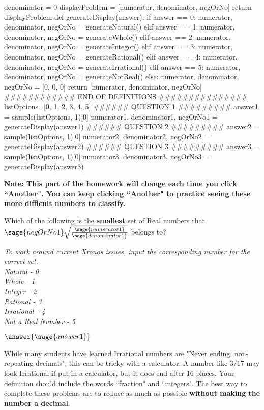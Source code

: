 \documentclass{ximera}
\begin{document}
\begin{sagesilent}
	denominator = 0
	displayProblem = [numerator, denominator, negOrNo]
	return displayProblem
	def generateDisplay(answer):
	if answer == 0:
	numerator, denominator, negOrNo = generateNatural()
	elif answer == 1:
	numerator, denominator, negOrNo = generateWhole()
	elif answer == 2:
	numerator, denominator, negOrNo = generateInteger()
	elif answer == 3:
	numerator, denominator, negOrNo = generateRational()
	elif answer == 4:
	numerator, denominator, negOrNo = generateIrrational()
	elif answer == 5:
	numerator, denominator, negOrNo = generateNotReal()
	else:
	numerator, denominator, negOrNo = [0, 0, 0]
	return [numerator, denominator, negOrNo]
	############ END OF DEFINITIONS ###############
	listOptions=[0, 1, 2, 3, 4, 5]
	###### QUESTION 1 #########
	answer1 = sample(listOptions, 1)[0]
	numerator1, denominator1, negOrNo1 = generateDisplay(answer1)
	###### QUESTION 2 #########
	answer2 = sample(listOptions, 1)[0]
	numerator2, denominator2, negOrNo2 = generateDisplay(answer2)
	###### QUESTION 3 #########
	answer3 = sample(listOptions, 1)[0]
	numerator3, denominator3, negOrNo3 = generateDisplay(answer3)
\end{sagesilent}

\textbf{Note: This part of the homework will change each time you click ``Another". You can keep clicking ``Another" to practice seeing these more difficult numbers to classify.}

\begin{exercise}
Which of the following is the \textbf{smallest} set of Real numbers that $\sage{negOrNo1} \sqrt{ \frac{\sage{numerator1}}{\sage{denominator1}}} $ belongs to?

\textit{To work around current Xronos issues, input the corresponding number for the correct set. \\
Natural - 0 \\
Whole - 1 \\
Integer - 2 \\
Rational - 3 \\
Irrational - 4 \\
Not a Real Number - 5
}

$\answer{\sage{answer1}}$

\begin{hint}
While many students have learned Irrational numbers are "Never ending, non-repeating decimals", this can be tricky with a calculator. A number like $3/17$ may look Irrational if put in a calculator, but it does end after 16 places. Your definition should include the words ``fraction" and ``integers". The best way to complete these problems are to reduce as much as possible \textbf{without making the number a decimal}.
\end{hint}
\end{exercise}
\end{document}
